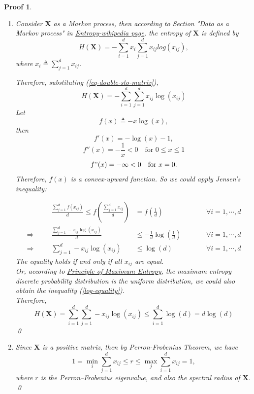 \documentclass[a4paper,UTF8]{article}
\numberwithin{equation}{section}
\newtheorem*{myProof}{Proof}
\begin{document}
\begin{myProof}
\begin{enumerate}[(1)]
\item 
Consider $\mathbf{X}$ as a Markov process, then according to Section "Data as a Markov process" in \href{https://en.wikipedia.org/wiki/Entropy_(information_theory)}{Entropy-wikipedia page}, the entropy of $\mathbf{X}$ is defined by 
$$H(\mathbf{X}) = -\sum_{i=1}^d x_i \sum_{j=1}^d x_{ij}log (x_{ij}), $$ 
where $x_i \triangleq \sum_{j=1}^d x_{ij}$. 

Therefore, substituting (\ref{eq-double-sto-matrix}), 
\begin{equation*}
  H(\mathbf{X}) = -\sum_{i=1}^d \sum_{j=1}^d x_{ij}\log (x_{ij})
\end{equation*}
Let $$f(x) \triangleq -x\log (x),$$ 
then $$f' (x)=-\log (x) -1,$$ 
$$f'' (x)=-\frac{1}{x} <0 \quad \text{for }0 \leq x \leq 1$$
$$ f"(x)=- \infty <0 \quad \text{for }x=0.$$
Therefore, $f(x)$ is a convex-upward function. So we could apply Jensen's inequality:
 
\begin{equation} \label{log-equality}
\begin{alignedat}{3}
 \quad &&
  \frac{\sum_{j=1}^d f(x_{ij})}{d} \leq f(\frac{\sum_{j=1}^d x_{ij}}{d}) &= f(\frac{1}{d})              \quad \quad && \forall i = 1,\cdots, d
   \\
\Rightarrow \quad &&
 \frac{\sum_{j=1}^d -x_{ij} \log (x_{ij})}{d} &\leq -\frac{1}{d}\log (\frac{1}{d}) \quad \quad && \forall i = 1,\cdots, d
\\
\Rightarrow \quad &&
\sum_{j=1}^d -x_{ij} \log (x_{ij}) &\leq \log (d) \quad \quad && \forall i = 1,\cdots, d
\end{alignedat}
\end{equation}
The equality holds if and only if all $x_{ij}$ are equal.\\
 Or, according to \href{https://en.wikipedia.org/wiki/Principle_of_maximum_entropy}{Principle of Maximum Entropy}, the maximum entropy discrete probability distribution is the uniform distribution, we could also obtain the inequality (\ref{log-equality}).\\
Therefore, 
$$ H(\mathbf{X}) = \sum_{i=1}^d \sum_{j=1}^d - x_{ij}\log (x_{ij}) \leq  \sum_{i=1}^d \log (d) = d \log (d) $$
\qed

\item
Since $\mathbf{X}$ is a positive matrix, then by Perron-Frobenius Theorem, we have 
$$1= \min_i \sum_{j=1}^d x_{ij} \leq r \leq \max_j \sum_{i=1}^d x_{ij} = 1,$$
where $r$ is the Perron–Frobenius eigenvalue, and also the spectral radius of $\mathbf{X}$.
\qed
\end{enumerate}
\end{myProof}
\newpage
\end{document}
